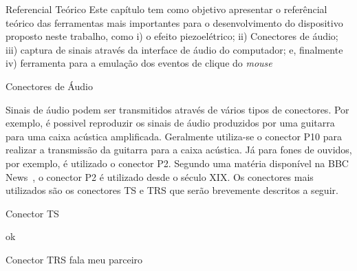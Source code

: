 \begin{chapter}{Referencial Teórico}
Este capítulo tem como objetivo apresentar o referêncial teórico das ferramentas
mais importantes para o desenvolvimento do dispositivo proposto neste trabalho,
como i) o efeito piezoelétrico; ii) Conectores de áudio; iii) captura de sinais
através da interface de áudio do computador; e, finalmente iv) ferramenta para a
emulação dos eventos de clique do \textit{mouse}

\begin{section}{Conectores de Áudio}

Sinais de áudio podem ser transmitidos através de vários tipos de conectores.
Por exemplo, é possivel reproduzir os sinais de áudio produzidos por uma
guitarra para uma caixa acústica amplificada. Geralmente utiliza-se o conector
P10 para realizar a transmissão da guitarra para a caixa acústica. Já para fones
de ouvidos, por exemplo, é utilizado o conector P2. Segundo uma matéria
disponível na BBC News~\cite{BBC}, o conector P2 é utilizado desde o século XIX.
Os conectores mais utilizados são os conectores TS e TRS que serão brevemente
descritos a seguir.

\begin{subsection}{Conector TS}

ok

\end{subsection}

\begin{subsection}{Conector TRS}
fala meu parceiro
\end{subsection}

\end{section}
\end{chapter}
